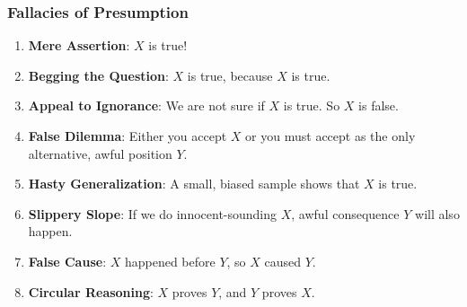 \documentclass[landscape]{article}
\newcommand{\notsowide}{\setlength{\parskip}{5mm}}
\begin{document}
\subsubsection*{Fallacies of Presumption}

\begin{enumerate} %

\item \textbf{Mere Assertion}: $X$ is true!

\item \textbf{Begging the Question}: $X$ is true, because $X$ is true.

\item \textbf{Appeal to Ignorance}: We are not sure if $X$ is true. So $X$ is false.

\item \textbf{False Dilemma}: Either you accept $X$ or you must accept as the only alternative, awful position $Y$.

\item \textbf{Hasty Generalization}: A small, biased sample shows that $X$ is true.

\item \textbf{Slippery Slope}: If we do innocent-sounding $X$, awful consequence $Y$ will also happen.

\item \textbf{False Cause}: $X$ happened before $Y$, so $X$ caused $Y$.

\item \textbf{Circular Reasoning}: $X$ proves $Y$, and $Y$ proves $X$.
\end{enumerate}
\end{document}
